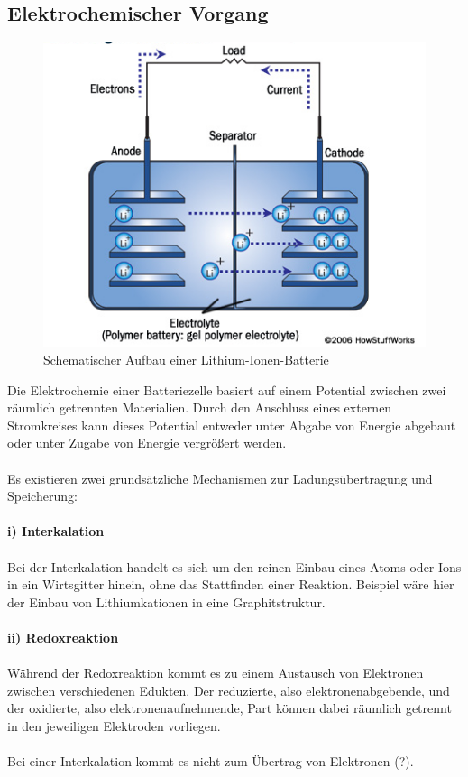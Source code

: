 \documentclass[a4paper, 11pt, headsepline,footsepline,twoside,abstract]{scrbook}
\begin{document}
\subsection{Elektrochemischer Vorgang}
\begin{figure}
	\centering
	\includegraphics[width=0.6\columnwidth]{images/Schematischer_Aufbau_Li_Ionen.png}
	\caption{Schematischer Aufbau einer Lithium-Ionen-Batterie}
	\label{schema_li_ionen}
\end{figure}
Die Elektrochemie einer Batteriezelle basiert auf einem Potential zwischen zwei räumlich getrennten Materialien. Durch den Anschluss eines externen Stromkreises kann dieses Potential entweder unter Abgabe von Energie abgebaut oder unter Zugabe von Energie vergrößert werden. 
\\\\
Es existieren zwei grundsätzliche Mechanismen zur Ladungsübertragung und Speicherung:
\\\\
\textbf{i) Interkalation}
\\\\
Bei der Interkalation handelt es sich um den reinen Einbau eines Atoms oder Ions in ein Wirtsgitter hinein, ohne das Stattfinden einer Reaktion. Beispiel wäre hier der Einbau von Lithiumkationen in eine Graphitstruktur.
\\\\
\textbf{ii) Redoxreaktion}
\\\\
Während der Redoxreaktion kommt es zu einem Austausch von Elektronen zwischen verschiedenen Edukten. Der reduzierte, also elektronenabgebende, und der oxidierte, also elektronenaufnehmende, Part können dabei räumlich getrennt in den jeweiligen Elektroden vorliegen.
\\\\
Bei einer Interkalation kommt es nicht zum Übertrag von Elektronen (?).
\end{document}
